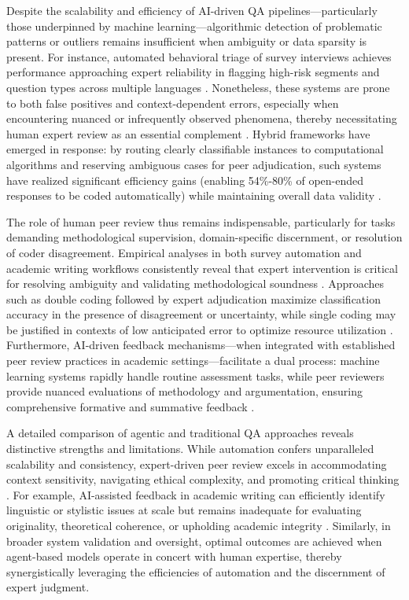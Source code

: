 Despite the scalability and efficiency of AI-driven QA pipelines—particularly those underpinned by machine learning—algorithmic detection of problematic patterns or outliers remains insufficient when ambiguity or data sparsity is present. For instance, automated behavioral triage of survey interviews achieves performance approaching expert reliability in flagging high-risk segments and question types across multiple languages \cite{ref97}\cite{ref98}. Nonetheless, these systems are prone to both false positives and context-dependent errors, especially when encountering nuanced or infrequently observed phenomena, thereby necessitating human expert review as an essential complement \cite{ref92}\cite{ref96}. Hybrid frameworks have emerged in response: by routing clearly classifiable instances to computational algorithms and reserving ambiguous cases for peer adjudication, such systems have realized significant efficiency gains (enabling 54\%-80\% of open-ended responses to be coded automatically) while maintaining overall data validity \cite{ref88}\cite{ref89}\cite{ref91}\cite{ref92}\cite{ref98}.

The role of human peer review thus remains indispensable, particularly for tasks demanding methodological supervision, domain-specific discernment, or resolution of coder disagreement. Empirical analyses in both survey automation and academic writing workflows consistently reveal that expert intervention is critical for resolving ambiguity and validating methodological soundness \cite{ref88}\cite{ref89}\cite{ref91}\cite{ref92}\cite{ref96}\cite{ref98}\cite{ref108}. Approaches such as double coding followed by expert adjudication maximize classification accuracy in the presence of disagreement or uncertainty, while single coding may be justified in contexts of low anticipated error to optimize resource utilization \cite{ref89}\cite{ref91}. Furthermore, AI-driven feedback mechanisms—when integrated with established peer review practices in academic settings—facilitate a dual process: machine learning systems rapidly handle routine assessment tasks, while peer reviewers provide nuanced evaluations of methodology and argumentation, ensuring comprehensive formative and summative feedback \cite{ref108}.

A detailed comparison of agentic and traditional QA approaches reveals distinctive strengths and limitations. While automation confers unparalleled scalability and consistency, expert-driven peer review excels in accommodating context sensitivity, navigating ethical complexity, and promoting critical thinking \cite{ref112}\cite{ref113}\cite{ref114}\cite{ref115}. For example, AI-assisted feedback in academic writing can efficiently identify linguistic or stylistic issues at scale but remains inadequate for evaluating originality, theoretical coherence, or upholding academic integrity \cite{ref112}\cite{ref113}. Similarly, in broader system validation and oversight, optimal outcomes are achieved when agent-based models operate in concert with human expertise, thereby synergistically leveraging the efficiencies of automation and the discernment of expert judgment. 

